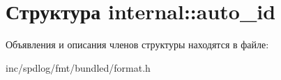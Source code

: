 \hypertarget{structinternal_1_1auto__id}{}\section{Структура internal\+:\+:auto\+\_\+id}
\label{structinternal_1_1auto__id}


Объявления и описания членов структуры находятся в файле\+:\begin{DoxyCompactItemize}
\item 
inc/spdlog/fmt/bundled/format.\+h\end{DoxyCompactItemize}
